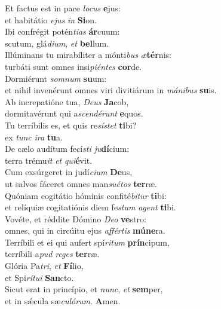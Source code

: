 \evenverse Et factus est in pace \textit{lo}\textit{cus} \textbf{e}jus:~\*\\
\evenverse et habitátio \textit{e}\textit{jus} \textit{in} \textbf{Si}on.\\
\oddverse Ibi confrégit potén\textit{ti}\textit{as} \textbf{ár}cuum:~\*\\
\oddverse scutum, glá\textit{di}\textit{um}, \textit{et} \textbf{bel}lum.\\
\evenverse Illúminans tu mirabíliter a mónti\textit{bus} \textit{æ}\textbf{tér}nis:~\*\\
\evenverse turbáti sunt omnes insi\textit{pi}\textit{én}\textit{tes} \textbf{cor}de.\\
\oddverse Dormiérunt \textit{som}\textit{num} \textbf{su}um:~\*\\
\oddverse et nihil invenérunt omnes viri divitiárum in \textit{má}\textit{ni}\textit{bus} \textbf{su}is.\\
\evenverse Ab increpatióne tua, \textit{De}\textit{us} \textbf{Ja}cob,~\*\\
\evenverse dormitavérunt qui a\textit{scen}\textit{dé}\textit{runt} \textbf{e}quos.\\
\oddverse Tu terríbilis es, et quis re\textit{sí}\textit{stet} \textbf{ti}bi?~\*\\
\oddverse ex \textit{tunc} \textit{i}\textit{ra} \textbf{tu}a.\\
\evenverse De cælo audítum fecí\textit{sti} \textit{ju}\textbf{dí}cium:~\*\\
\evenverse terra trému\textit{it} \textit{et} \textit{qui}\textbf{é}vit.\\
\oddverse Cum exsúrgeret in judí\textit{ci}\textit{um} \textbf{De}us,~\*\\
\oddverse ut salvos fáceret omnes man\textit{su}\textit{é}\textit{tos} \textbf{ter}ræ.\\
\evenverse Quóniam cogitátio hóminis confité\textit{bi}\textit{tur} \textbf{ti}bi:~\*\\
\evenverse et relíquiæ cogitatiónis diem fe\textit{stum} \textit{a}\textit{gent} \textbf{ti}bi.\\
\oddverse Vovéte, et réddite Dómino \textit{De}\textit{o} \textbf{ve}stro:~\*\\
\oddverse omnes, qui in circúitu ejus \textit{af}\textit{fér}\textit{tis} \textbf{mú}\textbf{ne}ra.\\
\evenverse Terríbili et ei qui aufert spí\textit{ri}\textit{tum} \textbf{prín}cipum,~\*\\
\evenverse terríbili a\textit{pud} \textit{re}\textit{ges} \textbf{ter}ræ.\\
\oddverse Glória Pa\textit{tri}, \textit{et} \textbf{Fí}lio,~\*\\
\oddverse et Spi\textit{rí}\textit{tu}\textit{i} \textbf{San}cto.\\
\evenverse Sicut erat in princípio, et \textit{nunc}, \textit{et} \textbf{sem}per,~\*\\
\evenverse et in sǽcula sæ\textit{cu}\textit{ló}\textit{rum}. \textbf{A}men.\\
